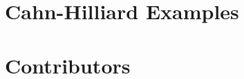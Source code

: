 \documentclass[tocAsPDFpart]{fipy}
\begin{document}
\chapter{Cahn-Hilliard Examples}




\backmatter


\fussy

% 



\printindex

\appendix 


\chapter*{Contributors}
\label{chap:Contributors}



\end{document}
